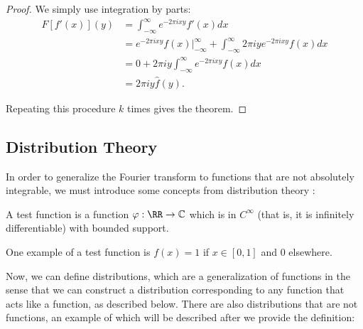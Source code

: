 \documentclass[11pt]{article}
\newcommand{\C}{\mathbb{C}}
\begin{document}
\begin{proof}
We simply use integration by parts:
    \begin{align*}
        F[f'(x)](y) &= \int_{-\infty}^\infty e^{-2\pi i xy} f'(x) dx\\
        &= e^{-2\pi i xy} f(x)|_{-\infty}^\infty + \int_{-\infty}^\infty 2 \pi i y e^{-2\pi i xy} f(x) dx\\
        &= 0 + 2\pi i y \int_{-\infty}^\infty e^{-2\pi i xy} f(x) dx\\
        &= 2 \pi i y \hat{f}(y).
    \end{align*}

    Repeating this procedure $k$ times gives the theorem.
\end{proof}

\subsection{Distribution Theory}
\label{app:DistTheory}

In order to generalize the Fourier transform to functions that are not absolutely integrable, we must introduce some concepts from distribution theory \cite{vanDijk+2013}:

\begin{definition} \label{def:testFunc}
    \item A test function is a function $\varphi:\RR\rightarrow \C$ which is in $C^\infty$ (that is, it is infinitely differentiable) with bounded support.
\end{definition}

\begin{example}
    One example of a test function is $f(x) = 1$ if $x \in [0,1]$ and $0$ elsewhere. 
\end{example}

Now, we can define distributions, which are a generalization of functions in the sense that we can construct a distribution corresponding to any function that acts like a function, as described below. There are also distributions that are not functions, an example of which will be described after we provide the definition:
\end{document}
